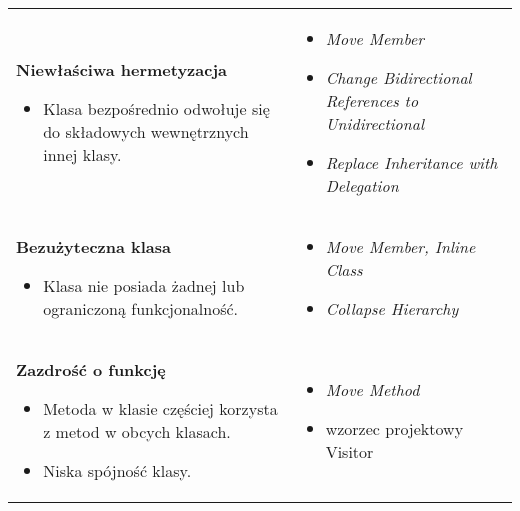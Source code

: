\documentclass[../main.tex]{subfiles}
\begin{document}
\begin{table}[H]
\begin{center}
\begin{tabular}{ p{.35\linewidth} p{.65\linewidth}}
                \cmidrule(r){1-1}\cmidrule(l){2-2}
                \textbf{Niewłaściwa hermetyzacja}
                \begin{itemize}
                    \item Klasa bezpośrednio odwołuje się do składowych wewnętrznych innej klasy.
                \end{itemize}
                &
                \begin{itemize}
                    \item \textit{Move Member}
                    \item \textit{Change Bidirectional References to Unidirectional}
                    \item \textit{Replace Inheritance with Delegation}
                \end{itemize}
                \\

                \cmidrule(r){1-1}\cmidrule(l){2-2}
                \textbf{Bezużyteczna klasa}
                \begin{itemize}
                    \item Klasa nie posiada żadnej lub ograniczoną funkcjonalność.
                \end{itemize}
                &
                \begin{itemize}
                    \item \textit{Move Member, Inline Class}
                    \item \textit{Collapse Hierarchy}
                \end{itemize}
                \\

                \cmidrule(r){1-1}\cmidrule(l){2-2}
                \textbf{Zazdrość o funkcję}
                \begin{itemize}
                    \item Metoda w klasie częściej korzysta z metod w obcych klasach.
                    \item Niska spójność klasy.
                \end{itemize}
                &
                \begin{itemize}
                    \item \textit{Move Method}
                    \item wzorzec projektowy Visitor
                \end{itemize}
                \\


\end{tabular}
\end{center}
\end{table}
\end{document}
